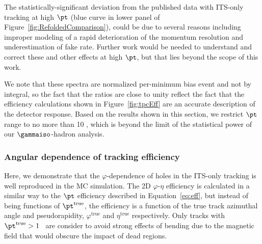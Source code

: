 The statistically-significant deviation from the published data with ITS-only tracking at high $\pt$ (blue curve in lower panel of Figure~\ref{fig:RefoldedComparison}), could be due to several reasons  including improper modeling of a rapid deterioration of the momentum resolution and underestimation of fake rate. Further work would be needed to understand and correct these and other effects at high $\pt$, but that lies beyond the scope of this work. 

We note that these spectra are normalized per-minimum bias event and not by integral, so the fact that the ratios are close to unity reflect the fact that the efficiency calculations shown in Figure~\ref{fig:tpcEff} are an accurate description of the detector response. Based on the results shown in this section, we restrict $\pt$ range to no more than 10 \GeVc, which is beyond the limit of the statistical power of our $\gammaiso$-hadron analysis. 

\FloatBarrier
\subsubsection{Angular dependence of tracking efficiency}
Here, we demonstrate that the $\varphi$-dependence of holes in the ITS-only tracking is well reproduced in the MC simulation. The 2D $\varphi$-$\eta$ efficiency is calculated in a similar way to the $\pt$ efficiency described in Equation~\ref{eq:eff}, but instead of being functions of $\pt^{\mathrm{true}}$, the efficiency is a function of the true track azimuthal angle and pseudorapidity, $\varphi^{\mathrm{true}}$ and $\eta^{\mathrm{true}}$ respectively. Only tracks with {$\pt^{\mathrm{true}}>1$} \GeVc~are consider to avoid strong effects of bending due to the magnetic field that would obscure the impact of dead regions.


